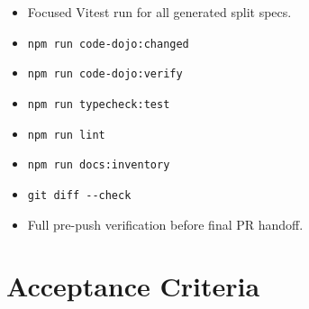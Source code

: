 \begin{itemize}
\tightlist
\item
  Focused Vitest run for all generated split specs.
\item
  \texttt{n\allowbreak{}p\allowbreak{}m\allowbreak{} \allowbreak{}r\allowbreak{}u\allowbreak{}n\allowbreak{} \allowbreak{}c\allowbreak{}o\allowbreak{}d\allowbreak{}e\allowbreak{}-\allowbreak{}d\allowbreak{}o\allowbreak{}j\allowbreak{}o\allowbreak{}:\allowbreak{}c\allowbreak{}h\allowbreak{}a\allowbreak{}n\allowbreak{}g\allowbreak{}e\allowbreak{}d}
\item
  \texttt{n\allowbreak{}p\allowbreak{}m\allowbreak{} \allowbreak{}r\allowbreak{}u\allowbreak{}n\allowbreak{} \allowbreak{}c\allowbreak{}o\allowbreak{}d\allowbreak{}e\allowbreak{}-\allowbreak{}d\allowbreak{}o\allowbreak{}j\allowbreak{}o\allowbreak{}:\allowbreak{}v\allowbreak{}e\allowbreak{}r\allowbreak{}i\allowbreak{}f\allowbreak{}y}
\item
  \texttt{n\allowbreak{}p\allowbreak{}m\allowbreak{} \allowbreak{}r\allowbreak{}u\allowbreak{}n\allowbreak{} \allowbreak{}t\allowbreak{}y\allowbreak{}p\allowbreak{}e\allowbreak{}c\allowbreak{}h\allowbreak{}e\allowbreak{}c\allowbreak{}k\allowbreak{}:\allowbreak{}t\allowbreak{}e\allowbreak{}s\allowbreak{}t}
\item
  \texttt{n\allowbreak{}p\allowbreak{}m\allowbreak{} \allowbreak{}r\allowbreak{}u\allowbreak{}n\allowbreak{} \allowbreak{}l\allowbreak{}i\allowbreak{}n\allowbreak{}t}
\item
  \texttt{n\allowbreak{}p\allowbreak{}m\allowbreak{} \allowbreak{}r\allowbreak{}u\allowbreak{}n\allowbreak{} \allowbreak{}d\allowbreak{}o\allowbreak{}c\allowbreak{}s\allowbreak{}:\allowbreak{}i\allowbreak{}n\allowbreak{}v\allowbreak{}e\allowbreak{}n\allowbreak{}t\allowbreak{}o\allowbreak{}r\allowbreak{}y}
\item
  \texttt{g\allowbreak{}i\allowbreak{}t\allowbreak{} \allowbreak{}d\allowbreak{}i\allowbreak{}f\allowbreak{}f\allowbreak{} \allowbreak{}-\allowbreak{}-\allowbreak{}c\allowbreak{}h\allowbreak{}e\allowbreak{}c\allowbreak{}k}
\item
  Full pre-push verification before final PR handoff.
\end{itemize}

\section{Acceptance Criteria}\label{record-243-acceptance-criteria}

